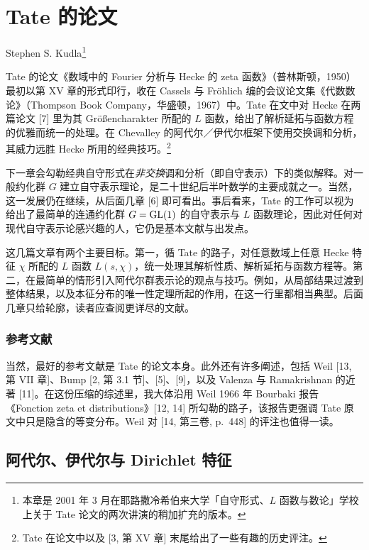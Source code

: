 \chapter{Tate 的论文}\label{ch:06}

\begingroup
\renewcommand{\thefootnote}{\fnsymbol{footnote}}
\begin{center}
Stephen S. Kudla\footnote{本章是 2001 年 3 月在耶路撒冷希伯来大学「自守形式、$L$ 函数与数论」学校上关于 Tate 论文的两次讲演的稍加扩充的版本。}
\end{center}
\endgroup
\setcounter{footnote}{0}

Tate 的论文《数域中的 Fourier 分析与 Hecke 的 zeta 函数》（普林斯顿，1950）最初以第 XV 章的形式印行，收在 Cassels 与 Fr\"ohlich 编的会议论文集《代数数论》（Thompson Book Company，华盛顿，1967）中。Tate 在文中对 Hecke 在两篇论文 [7] 里为其 Gr\"o\ss encharakter 所配的 $L$ 函数，给出了解析延拓与函数方程的优雅而统一的处理。在 Chevalley 的阿代尔／伊代尔框架下使用交换调和分析，其威力远胜 Hecke 所用的经典技巧。\footnote{Tate 在论文中以及 [3, 第 XV 章] 末尾给出了一些有趣的历史评注。}

下一章会勾勒经典自守形式在\emph{非交换}调和分析（即自守表示）下的类似解释。对一般约化群 $G$ 建立自守表示理论，是二十世纪后半叶数学的主要成就之一。当然，这一发展仍在继续，从后面几章 [6] 即可看出。事后看来，Tate 的工作可以视为给出了最简单的连通约化群 $G=\mathrm{GL}(1)$ 的自守表示与 $L$ 函数理论，因此对任何对现代自守表示论感兴趣的人，它仍是基本文献与出发点。

这几篇文章有两个主要目标。第一，循 Tate 的路子，对任意数域上任意 Hecke 特征 $\chi$ 所配的 $L$ 函数 $L(s,\chi)$，统一处理其解析性质、解析延拓与函数方程等。第二，在最简单的情形引入阿代尔群表示论的观点与技巧。例如，从局部结果过渡到整体结果，以及本征分布的唯一性定理所起的作用，在这一行里都相当典型。后面几章只给轮廓，读者应查阅更详尽的文献。

\subsection*{参考文献}

当然，最好的参考文献是 Tate 的论文本身。此外还有许多阐述，包括 Weil [13, 第 VII 章]、Bump [2, 第 3.1 节]、[5]、[9]，以及 Valenza 与 Ramakrishnan 的近著 [11]。在这份压缩的综述里，我大体沿用 Weil 1966 年 Bourbaki 报告《Fonction zeta et distributions》[12, 14] 所勾勒的路子，该报告更强调 Tate 原文中只是隐含的等变分布。Weil 对 [14, 第三卷, p.~448] 的评注也值得一读。

\section{阿代尔、伊代尔与 Dirichlet 特征}

